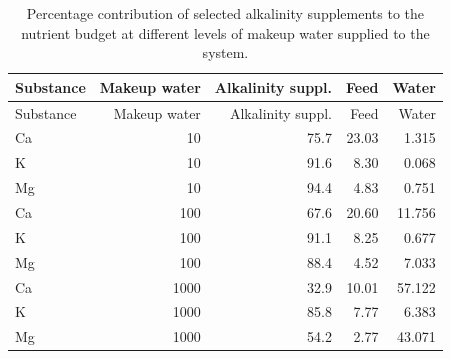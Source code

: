 \documentclass[
]{article}
\begin{document}
\begin{longtable}[]{@{}lrrrr@{}}
\caption{Percentage contribution of selected alkalinity supplements to
the nutrient budget at different levels of makeup water supplied to the
system.}\tabularnewline
\toprule\noalign{}
Substance & Makeup water & Alkalinity suppl. & Feed & Water \\
\midrule\noalign{}
\endfirsthead
\toprule\noalign{}
Substance & Makeup water & Alkalinity suppl. & Feed & Water \\
\midrule\noalign{}
\endhead
\bottomrule\noalign{}
\endlastfoot
Ca & 10 & 75.7 & 23.03 & 1.315 \\
K & 10 & 91.6 & 8.30 & 0.068 \\
Mg & 10 & 94.4 & 4.83 & 0.751 \\
Ca & 100 & 67.6 & 20.60 & 11.756 \\
K & 100 & 91.1 & 8.25 & 0.677 \\
Mg & 100 & 88.4 & 4.52 & 7.033 \\
Ca & 1000 & 32.9 & 10.01 & 57.122 \\
K & 1000 & 85.8 & 7.77 & 6.383 \\
Mg & 1000 & 54.2 & 2.77 & 43.071 \\
\end{longtable}
\end{document}

